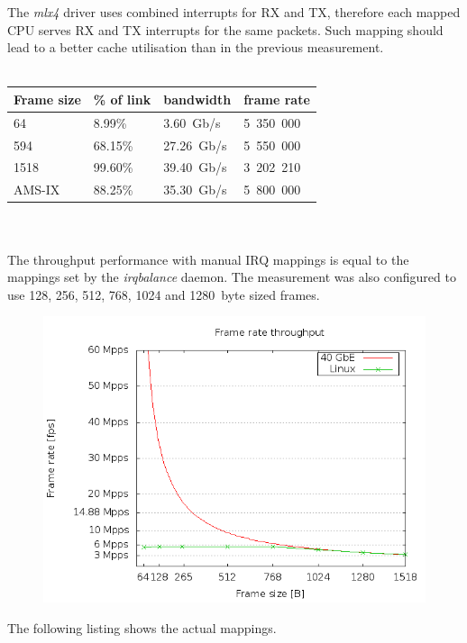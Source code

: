 The {\it{mlx4}} driver uses combined interrupts for RX and TX,
therefore each mapped CPU serves RX and TX interrupts for the same packets.
Such mapping should lead to a better cache utilisation than in the previous measurement.
\\
\\
\begin{tabular}{ | l | l | l | l |}
\hline
Frame size & \% of link & bandwidth & frame rate \\
\hline
64     &  8.99\% &  3.60~Gb/s & 5~350~000 \\
594    & 68.15\% & 27.26~Gb/s & 5~550~000 \\
1518   & 99.60\% & 39.40~Gb/s & 3~202~210 \\
AMS-IX & 88.25\% & 35.30~Gb/s & 5~800~000 \\
\hline
\end{tabular}
\\
\\
The throughput performance with manual IRQ mappings is equal to the mappings set by the {\it{irqbalance}} daemon.
The measurement was also configured to use 128, 256, 512, 768, 1024 and 1280~byte sized frames.
\begin{figure}[H]
	\centering
	\includegraphics[width=12cm,keepaspectratio]{fig/frames.png}
\end{figure}
The following listing shows the actual mappings.

\newpage

